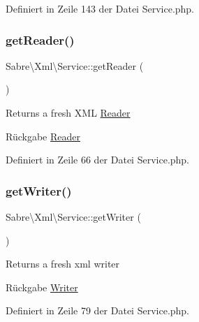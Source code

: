 Definiert in Zeile 143 der Datei Service.\+php.

\mbox{\label{class_sabre_1_1_xml_1_1_service_ae35b9eb37840ddd46780e21f5869cbcf}} 
\subsubsection{\texorpdfstring{get\+Reader()}{getReader()}}
{\footnotesize\ttfamily Sabre\textbackslash{}\+Xml\textbackslash{}\+Service\+::get\+Reader (\begin{DoxyParamCaption}{ }\end{DoxyParamCaption})}

Returns a fresh X\+ML \mbox{\hyperlink{class_sabre_1_1_xml_1_1_reader}{Reader}}

\begin{DoxyReturn}{Rückgabe}
\mbox{\hyperlink{class_sabre_1_1_xml_1_1_reader}{Reader}} 
\end{DoxyReturn}


Definiert in Zeile 66 der Datei Service.\+php.

\mbox{\label{class_sabre_1_1_xml_1_1_service_ae31e73ea53c5bdbfb46bc1c0f013307b}} 
\subsubsection{\texorpdfstring{get\+Writer()}{getWriter()}}
{\footnotesize\ttfamily Sabre\textbackslash{}\+Xml\textbackslash{}\+Service\+::get\+Writer (\begin{DoxyParamCaption}{ }\end{DoxyParamCaption})}

Returns a fresh xml writer

\begin{DoxyReturn}{Rückgabe}
\mbox{\hyperlink{class_sabre_1_1_xml_1_1_writer}{Writer}} 
\end{DoxyReturn}


Definiert in Zeile 79 der Datei Service.\+php.

\mbox{\label{class_sabre_1_1_xml_1_1_service_a9dd6c5eb721775a3fec5f749c89e35ce}} 
